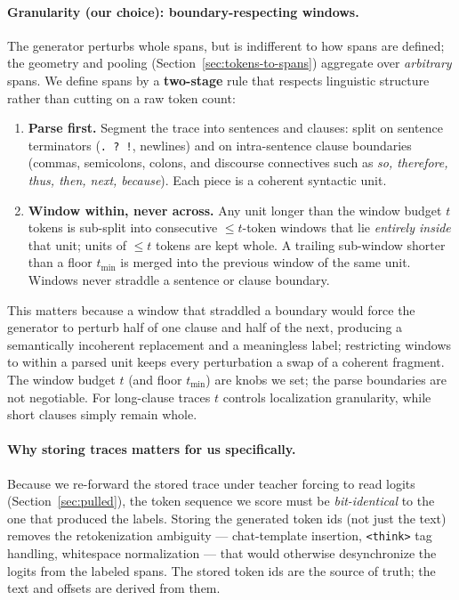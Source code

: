 \documentclass[11pt]{article}
\begin{document}
\paragraph{Granularity (our choice): boundary-respecting windows.}
\label{sec:granularity}
The generator perturbs whole spans, but is indifferent to how spans are defined; the geometry and pooling (Section~\ref{sec:tokens-to-spans}) aggregate over \emph{arbitrary} spans. We define spans by a \textbf{two-stage} rule that respects linguistic structure rather than cutting on a raw token count:
\begin{enumerate}[leftmargin=1.7em]
  \item \textbf{Parse first.} Segment the trace into sentences and clauses: split on sentence terminators (\texttt{.\,?\,!}, newlines) and on intra-sentence clause boundaries (commas, semicolons, colons, and discourse connectives such as \emph{so, therefore, thus, then, next, because}). Each piece is a coherent syntactic unit.
  \item \textbf{Window within, never across.} Any unit longer than the window budget $t$ tokens is sub-split into consecutive $\le t$-token windows that lie \emph{entirely inside} that unit; units of $\le t$ tokens are kept whole. A trailing sub-window shorter than a floor $t_{\min}$ is merged into the previous window of the same unit. Windows never straddle a sentence or clause boundary.
\end{enumerate}
This matters because a window that straddled a boundary would force the generator to perturb half of one clause and half of the next, producing a semantically incoherent replacement and a meaningless label; restricting windows to within a parsed unit keeps every perturbation a swap of a coherent fragment. The window budget $t$ (and floor $t_{\min}$) are knobs we set; the parse boundaries are not negotiable. For long-clause traces $t$ controls localization granularity, while short clauses simply remain whole.

\paragraph{Why storing traces matters for us specifically.} Because we re-forward the stored trace under teacher forcing to read logits (Section~\ref{sec:pulled}), the token sequence we score must be \emph{bit-identical} to the one that produced the labels. Storing the generated token ids (not just the text) removes the retokenization ambiguity --- chat-template insertion, \texttt{<think>} tag handling, whitespace normalization --- that would otherwise desynchronize the logits from the labeled spans. The stored token ids are the source of truth; the text and offsets are derived from them.
\end{document}
